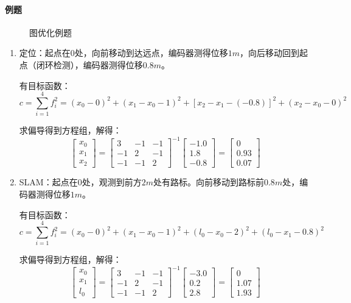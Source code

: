 \documentclass[
12pt, %
a4paper, 
oneside, %
headinclude,footinclude, %
]{scrartcl}
\begin{document}
\paragraph{例题}
\begin{figure}[H]
\centering
{} \quad
{}
\caption{图优化例题}
\end{figure}

\begin{enumerate}
\item 定位：起点在$ 0 $处，向前移动到达远点，编码器测得位移$ 1m $，向后移动回到起点（闭环检测），编码器测得位移$ 0.8m $。

有目标函数：
$$ c = \sum_{i = 1}^{4} f_i^2 = (x_0 - 0)^2 + (x_1 - x_0 - 1)^2 + [x_2 - x_1 -(-0.8)]^2 +(x_2 - x_0 - 0)^2 $$

求偏导得到方程组，解得：
$$
\begin{bmatrix}  x_0 \\ x_1 \\ x_2 \end{bmatrix} 
= \begin{bmatrix} 3 & -1 & -1 \\ -1 & 2 & -1 \\ -1 & -1 & 2 \end{bmatrix}^{-1} \begin{bmatrix} -1.0 \\ 1.8 \\ -0.8 \end{bmatrix} 
= \begin{bmatrix} 0 \\ 0.93 \\ 0.07 \end{bmatrix}
$$
\item SLAM：起点在$ 0 $处，观测到前方$ 2m $处有路标。向前移动到路标前$ 0.8m $处，编码器测得位移$ 1m $。

有目标函数：
$$ c = \sum_{i = 1}^{4} f_i^2 = (x_0 - 0)^2 + (x_1 - x_0 - 1)^2 + (l_0 - x_0 - 2)^2 +(l_0 - x_1 - 0.8)^2 $$

求偏导得到方程组，解得：
$$
\begin{bmatrix}  x_0 \\ x_1 \\ l_0 \end{bmatrix} 
= \begin{bmatrix} 3 & -1 & -1 \\ -1 & 2 & -1 \\ -1 & -1 & 2 \end{bmatrix}^{-1} \begin{bmatrix} -3.0 \\ 0.2 \\ 2.8 \end{bmatrix} 
= \begin{bmatrix} 0 \\ 1.07 \\ 1.93 \end{bmatrix}
$$
\end{enumerate}
\end{document}
